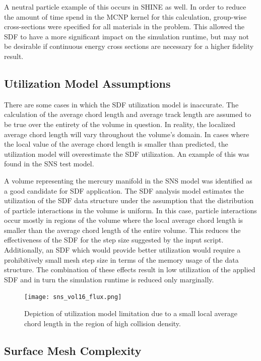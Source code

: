 A neutral particle example of this occurs in SHINE as well. In order to
reduce the amount of time spend in the MCNP kernel for this calculation,
group-wise cross-sections were specified for all materials in the problem. This
allowed the SDF to have a more significant impact on the simulation runtime, but
may not be desirable if continuous energy cross sections are necessary for a
higher fidelity result.

\subsection{Utilization Model Assumptions}\label{subsec:sdf_util_model_limits}

There are some cases in which the SDF utilization model is inaccurate. The
calculation of the average chord length and average track length are assumed to
be true over the entirety of the volume in question. In reality, the localized
average chord length will vary throughout the volume's domain. In cases where
the local value of the average chord length is smaller than predicted, the
utilization model will overestimate the SDF utilization. An example of this was
found in the SNS test model.

A volume representing the mercury manifold in the SNS model was identified as a
good candidate for SDF application. The SDF analysis model estimates the
utilization of the SDF data structure under the assumption that the distribution
of particle interactions in the volume is uniform. In this case, particle
interactions occur mostly in regions of the volume where the local average chord
length is smaller than the average chord length of the entire volume. This
reduces the effectiveness of the SDF for the step size suggested by the input
script. Additionally, an SDF which would provide better utilization would
require a prohibitively small mesh step size in terms of the memory usage of the
data structure. The combination of these effects result in low utilization of
the applied SDF and in turn the simulation runtime is reduced only marginally.

\begin{figure}
  \centering
  \texttt{[image: sns\_vol16\_flux.png]}
  \caption[Mesh tally results of the SNS model.]{Depiction of utilization model
    limitation due to a small local average chord length in the region of high
    collision density.}
  \label{fig:sns_low_util}
\end{figure}

\subsection{Surface Mesh Complexity}\label{subsec:sdf_tree_depth}

